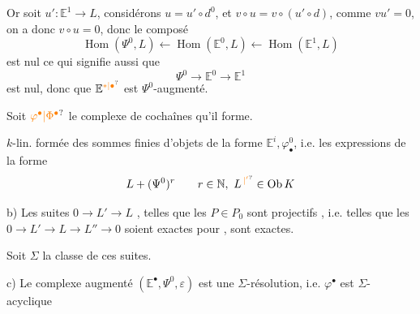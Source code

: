 
Or soit $u'\colon\mathbb E^1\to L$, considérons $u=u'\circ d^0$, et $v\circ u=v\circ(u'\circ d)$,  comme $vu'=0$, on a donc $v\circ u=0$, donc le composé 
\[
\operatorname{Hom}(\Psi^0,L)\longleftarrow\operatorname{Hom}(\mathbb E^0,L)\longleftarrow\operatorname{Hom}(\mathbb E^1,L)
\]
est nul ce qui signifie aussi que
\[
\Psi^0\longrightarrow\mathbb E^0\longrightarrow\mathbb E^1
\]
est nul, donc que $\mathbb E^{\unsure{*|\bullet}}$ est $\Psi^0$-augmenté.


Soit $\unsure{\varphi^\bullet|\Phi^\bullet}$ le complexe de cochaînes qu'il forme.

 



$k$-lin.  formée des sommes finies d'objets de la forme $\mathbb E^i,\varphi_{\bullet}^{0}$, i.e. les expressions de la forme
\[
L+(\Psi^0)^r\qquad r\in\mathbb N,\ L^{\unsure{\,|'}}\in\operatorname{Ob} K
\]


b) Les suites $0\to L'\to L$   , telles que les $P\in P_0$ sont projectifs , i.e. telles que les $0\to L'\to L\to L''\to0$ soient exactes pour , sont exactes.

 Soit $\Sigma$ la classe de ces suites.

c) Le complexe augmenté $(\mathbb E^\bullet,\Psi^0,\varepsilon)$ est une $\Sigma$-résolution, i.e. $\varphi^\bullet$ est $\Sigma$-acyclique

